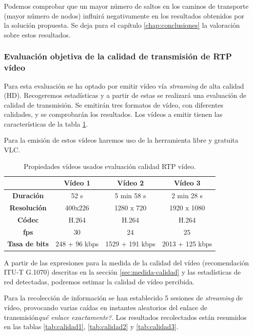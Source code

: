 \documentclass[a4paper,11pt]{book}
\begin{document}
Podemos comprobar que un mayor número de saltos en los caminos de transporte (mayor número de nodos) influirá negativamente en los resultados obtenidos por la solución propuesta. Se deja para el capítulo \ref{chap:conclusiones} la valoración sobre estos resultados.

%
\subsubsection{Evaluación objetiva de la calidad de transmisión de \ac{RTP} vídeo}\label{subsub:video}
Para esta evaluación se ha optado por emitir vídeo vía \textit{streaming} de alta calidad (\ac{HD}). Recogeremos estadísticas y a partir de estas se realizará una evaluación de calidad de transmisión. Se emitirán tres formatos de vídeo, con diferentes calidades, y se comprobarán los resultados. Los vídeos a emitir tienen las características de la tabla \ref{videos}.

Para la emisión de estos vídeos haremos uso de la herramienta libre y gratuita VLC.

\begin{table}[tb]
\centering
\begin{tabular}{|c|c|c|c|}
\hline
                   & {\bf Vídeo 1} & {\bf Vídeo 2} & {\bf Vídeo 3} \\ \hline
{\bf Duración}     & 52 s          & 5 min 58 s    & 2 min 28 s    \\ \hline
{\bf Resolución}   & 400x226       & 1280 x 720    & 1920 x 1080   \\ \hline
{\bf Códec}        & H.264         & H.264         & H.264         \\ \hline
{\bf fps}          & 30            & 24            & 25            \\ \hline
{\bf Tasa de bits} & 248 + 96 kbps      & 1529 + 191 kbps     & 2013 + 125 kbps     \\ \hline
\end{tabular}
\caption{Propiedades vídeos usados evaluación calidad \ac{RTP} vídeo.}
\label{videos}
\end{table}


A partir de las expresiones para la medida de la calidad del vídeo (recomendación ITU-T G.1070) descritas en la sección \ref{sec:medida-calidad}  y las estadísticas de red detectadas, podremos estimar la calidad de vídeo percibida.

Para la recolección de información se han establecido 5 sesiones de \emph{streaming} de vídeo, provocando varias caídas en instantes aleatorios del enlace de transmisión\emph{qué enlace exactamente?}. Los resultados recolectados están resumidos en las tablas \ref{tab:calidad1}, \ref{tab:calidad2} y \ref{tab:calidad3}.
\end{document}
